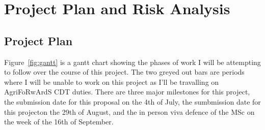 \documentclass[runningheads]{llncs}
\begin{document}
\section{Project Plan and Risk Analysis} %
    \subsection{Project Plan}
        Figure~\ref{fig:gantt} is a gantt chart showing the phases of work I will be attempting to follow over the course of this project. The two greyed out bars are periods where I will be unable to work on this project as I'll be travalling on AgriFoRwArdS CDT duties. There are three major milestones for this project, the submission date for this proposal on the 4th of July, the sumbmission date for this projecton the 29th of August, and the in person viva defence of the MSc on the week of the 16th of September.
\end{document}
